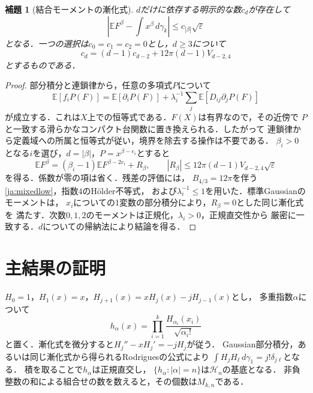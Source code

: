 \documentclass[12pt]{amsart}
\theoremstyle{definition}
\theoremstyle{remark}
\numberwithin{equation}{section}
\newcommand{\E}{\mathbb E}
\newcommand{\gauss}{\gamma_k}
\newcommand{\eps}{\varepsilon}
\theoremstyle{plain}
\newtheorem{jalem}[thm]{補題}
\begin{document}
\begin{jalem}[結合モーメントの漸化式]\label{ja:moments}
$d$だけに依存する明示的な数$c_d$が存在して
\begin{equation}\label{ja:momentbound}
 \left|\E F^\beta-\int x^\beta\,d\gauss\right|
 \leq c_{|\beta|}\sqrt\eps
\end{equation}
となる．一つの選択は$c_0=c_1=c_2=0$とし，$d\geq3$について
\begin{equation}\label{ja:momentconstant}
 c_d=(d-1)c_{d-2}+12\pi(d-1)V_{d-2,4}
\end{equation}
とするものである．
\end{jalem}
\begin{proof}
部分積分と連鎖律から，任意の多項式$P$について
\begin{equation}\label{ja:ibp}
 \E[f_iP(F)]=\E[\partial_iP(F)]
       +\lambda_i^{-1}\sum_j\E[D_{ij}\partial_jP(F)]
\end{equation}
が成立する．これは$X$上での恒等式である．$F(X)$は有界なので，その近傍で
$P$と一致する滑らかなコンパクト台関数に置き換えられる．したがって
連鎖律から定義域への所属と恒等式が従い，境界を除去する操作は不要である．
$\beta_i>0$となる$i$を選び，$d=|\beta|$，$P=x^{\beta-e_i}$とすると
\[
 \E F^\beta=(\beta_i-1)\E F^{\beta-2e_i}+R_\beta,
 \qquad |R_\beta|\leq12\pi(d-1)V_{d-2,4}\sqrt\eps
\]
を得る．係数が零の項は省く．残差の評価には，
$B_{4/3}=12\pi$を伴う\eqref{ja:mixedlow}，指数$4$のH\"older不等式，
および$\lambda_i^{-1}\leq1$を用いた．標準Gaussianのモーメントは，
$x_i$についての1変数の部分積分により，$R_\beta=0$とした同じ漸化式を
満たす．次数$0,1,2$のモーメントは正規化，$\lambda_i>0$，正規直交性から
厳密に一致する．$d$についての帰納法により結論を得る．
\end{proof}

\section{主結果の証明}
$H_0=1$，$H_1(x)=x$，$H_{j+1}(x)=xH_j(x)-jH_{j-1}(x)$とし，
多重指数$\alpha$について
\[
 h_\alpha(x)=\prod_{i=1}^k\frac{H_{\alpha_i}(x_i)}{\sqrt{\alpha_i!}}
\]
と置く．漸化式を微分すると$H_j''-xH_j'=-jH_j$が従う．
Gaussian部分積分，あるいは同じ漸化式から得られるRodriguesの公式により
$\int H_jH_\ell\,d\gamma_1=j!\delta_{j\ell}$となる．
積を取ることで$h_\alpha$は正規直交し，
$\{h_\alpha:|\alpha|=n\}$は$\mathcal H_n$の基底となる．
非負整数の和による組合せの数を数えると，その個数は$M_{k,n}$である．
\end{document}
